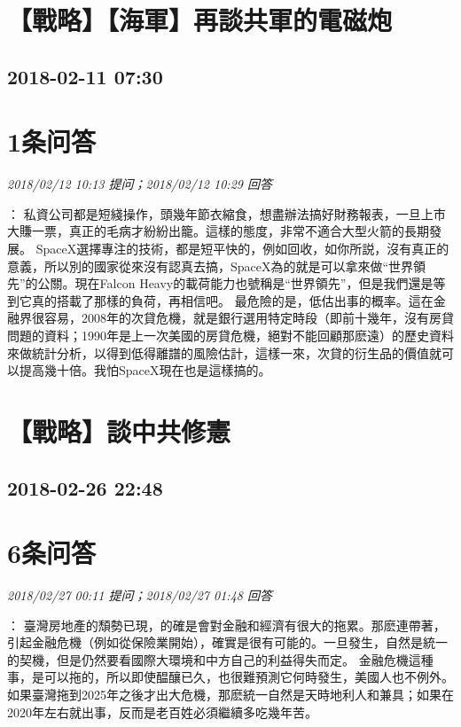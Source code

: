 \documentclass[twocolumn]{ctexart}
\begin{document}
\section{【戰略】【海軍】再談共軍的電磁炮}
\subsection{2018-02-11 07:30}


\section{1条问答}

\textit{\hfill\noindent\small 2018/02/12 10:13 提问；2018/02/12 10:29 回答}

：
私資公司都是短綫操作，頭幾年節衣縮食，想盡辦法搞好財務報表，一旦上市大賺一票，真正的毛病才紛紛出籠。這樣的態度，非常不適合大型火箭的長期發展。
SpaceX選擇專注的技術，都是短平快的，例如回收，如你所説，沒有真正的意義，所以別的國家從來沒有認真去搞，SpaceX為的就是可以拿來做“世界領先”的公關。現在Falcon Heavy的載荷能力也號稱是“世界領先”，但是我們還是等到它真的搭載了那樣的負荷，再相信吧。
最危險的是，低估出事的概率。這在金融界很容易，2008年的次貸危機，就是銀行選用特定時段（即前十幾年，沒有房貸問題的資料；1990年是上一次美國的房貸危機，絕對不能回顧那麽遠）的歷史資料來做統計分析，以得到低得離譜的風險估計，這樣一來，次貸的衍生品的價值就可以提高幾十倍。我怕SpaceX現在也是這樣搞的。
\\


\section{【戰略】談中共修憲}
\subsection{2018-02-26 22:48}


\section{6条问答}

\textit{\hfill\noindent\small 2018/02/27 00:11 提问；2018/02/27 01:48 回答}

：
臺灣房地產的頹勢已現，的確是會對金融和經濟有很大的拖累。那麽連帶著，引起金融危機（例如從保險業開始），確實是很有可能的。一旦發生，自然是統一的契機，但是仍然要看國際大環境和中方自己的利益得失而定。
金融危機這種事，是可以拖的，所以即使醖釀已久，也很難預測它何時發生，美國人也不例外。
如果臺灣拖到2025年之後才出大危機，那麽統一自然是天時地利人和兼具；如果在2020年左右就出事，反而是老百姓必須繼續多吃幾年苦。
\\
\end{document}
